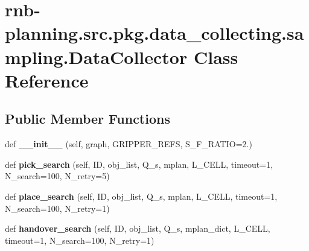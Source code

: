 \hypertarget{classrnb-planning_1_1src_1_1pkg_1_1data__collecting_1_1sampling_1_1_data_collector}{}\section{rnb-\/planning.src.\+pkg.\+data\+\_\+collecting.\+sampling.\+Data\+Collector Class Reference}
\label{classrnb-planning_1_1src_1_1pkg_1_1data__collecting_1_1sampling_1_1_data_collector}
\subsection*{Public Member Functions}
\begin{DoxyCompactItemize}
\item 
\mbox{\label{classrnb-planning_1_1src_1_1pkg_1_1data__collecting_1_1sampling_1_1_data_collector_ac619b064c1a48acb5c1c878935a329ba}} 
def {\bfseries \+\_\+\+\_\+init\+\_\+\+\_\+} (self, graph, G\+R\+I\+P\+P\+E\+R\+\_\+\+R\+E\+FS, S\+\_\+\+F\+\_\+\+R\+A\+T\+IO=2.)
\item 
\mbox{\label{classrnb-planning_1_1src_1_1pkg_1_1data__collecting_1_1sampling_1_1_data_collector_aacd13bfd1ae076361a96997d97afd6cd}} 
def {\bfseries pick\+\_\+search} (self, ID, obj\+\_\+list, Q\+\_\+s, mplan, L\+\_\+\+C\+E\+LL, timeout=1, N\+\_\+search=100, N\+\_\+retry=5)
\item 
\mbox{\label{classrnb-planning_1_1src_1_1pkg_1_1data__collecting_1_1sampling_1_1_data_collector_ac9f4bd0c86f780a5ce5c1e566010c230}} 
def {\bfseries place\+\_\+search} (self, ID, obj\+\_\+list, Q\+\_\+s, mplan, L\+\_\+\+C\+E\+LL, timeout=1, N\+\_\+search=100, N\+\_\+retry=1)
\item 
\mbox{\label{classrnb-planning_1_1src_1_1pkg_1_1data__collecting_1_1sampling_1_1_data_collector_ae70726341710e040003a912d28f0efa8}} 
def {\bfseries handover\+\_\+search} (self, ID, obj\+\_\+list, Q\+\_\+s, mplan\+\_\+dict, L\+\_\+\+C\+E\+LL, timeout=1, N\+\_\+search=100, N\+\_\+retry=1)

\end{DoxyCompactItemize}
